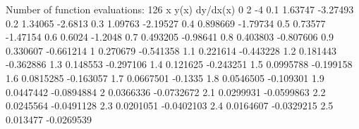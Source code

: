 Number of function evaluations: 126
              x           y(x)      dy/dx(x)
              0              2             -4
            0.1        1.63747       -3.27493
            0.2        1.34065        -2.6813
            0.3        1.09763       -2.19527
            0.4       0.898669       -1.79734
            0.5        0.73577       -1.47154
            0.6         0.6024        -1.2048
            0.7       0.493205       -0.98641
            0.8       0.403803      -0.807606
            0.9       0.330607      -0.661214
              1       0.270679      -0.541358
            1.1       0.221614      -0.443228
            1.2       0.181443      -0.362886
            1.3       0.148553      -0.297106
            1.4       0.121625      -0.243251
            1.5      0.0995788      -0.199158
            1.6      0.0815285      -0.163057
            1.7      0.0667501        -0.1335
            1.8      0.0546505      -0.109301
            1.9      0.0447442     -0.0894884
              2      0.0366336     -0.0732672
            2.1      0.0299931     -0.0599863
            2.2      0.0245564     -0.0491128
            2.3      0.0201051     -0.0402103
            2.4      0.0164607     -0.0329215
            2.5       0.013477     -0.0269539
